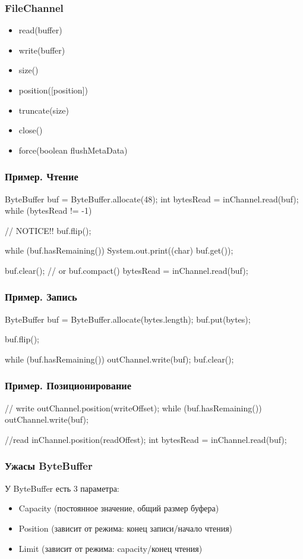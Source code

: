 \documentclass[russian,aspectratio=169,14pt]{beamer}
\begin{document}
\begin{frame}
	\frametitle{FileChannel}
	\begin{itemize}
		\item read(buffer)
		\item write(buffer)
		\pause
		\item size()
		\item position($[$position$]$)
		\item truncate(size)
		\pause
		\item close()
		\item force(boolean flushMetaData)
	\end{itemize}
\end{frame}


\begin{frame}[fragile]
	\frametitle{Пример. Чтение}
	\begin{listjava}
ByteBuffer buf = ByteBuffer.allocate(48);
int bytesRead = inChannel.read(buf);
while (bytesRead != -1) {
    // NOTICE!!
    buf.flip();
            
    while (buf.hasRemaining()) {
        System.out.print((char) buf.get());
    }
            
    buf.clear(); // or buf.compact()
    bytesRead = inChannel.read(buf);
}
	\end{listjava}
\end{frame}

\begin{frame}[fragile]
	\frametitle{Пример. Запись}
	\begin{listjava}
ByteBuffer buf = ByteBuffer.allocate(bytes.length);
buf.put(bytes);
        
buf.flip();
        
while (buf.hasRemaining()) {
    outChannel.write(buf);
}
buf.clear();
	\end{listjava}
\end{frame}

\begin{frame}[fragile]
	\frametitle{Пример. Позиционирование}
	\begin{listjava}
// write
outChannel.position(writeOffset);
while (buf.hasRemaining()) {
    outChannel.write(buf);
}

//read
inChannel.position(readOffest);
int bytesRead = inChannel.read(buf);
	\end{listjava}
\end{frame}

\begin{frame}
	\frametitle{Ужасы ByteBuffer}
	У ByteBuffer есть 3 параметра:
	\begin{itemize}
		\item Capacity (постоянное значение, общий размер буфера)
		\item Position (зависит от режима: конец записи/начало чтения)
		\item Limit (зависит от режима: capacity/конец чтения)
	\end{itemize}
\end{frame}
\end{document}
